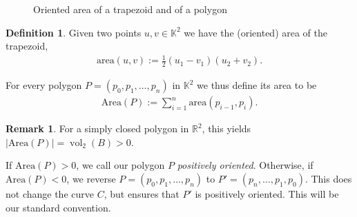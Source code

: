 \documentclass[a4paper]{amsart}
\numberwithin{equation}{section}
\theoremstyle{plain}
\theoremstyle{definition}
\newtheorem{definition}[theorem]{Definition}
\newtheorem{remark}[theorem]{Remark}
\newcommand{\R}{\mathbb{R}}
\newcommand{\K}{\mathbb{K}}
\newcommand{\abs}[1]{\lvert #1 \rvert}
\DeclareMathOperator{\vol}{vol}
\newcommand{\area}{\mathrm{area}}
\newcommand{\Area}{\mathrm{Area}}
\begin{document}
\begin{figure}[ht]
  \caption{Oriented area of a trapezoid and of a polygon}
  \label{fig:AreaAngle}
\end{figure}

\begin{definition}
  Given two points $u,v \in \K^2$ we have the (oriented) area of the trapezoid,
  \begin{align}
    \area(u,v) := \frac{1}{2} (u_1 - v_1) (u_2 + v_2) .
  \end{align}
  
  For every polygon $P = (p_0,p_1,\ldots,p_n)$ in $\K^2$
  we thus define its area to be 
  \begin{align}
    \label{eq:Area}
    \Area(P) := \sum_{i=1}^{n} \area(p_{i-1},p_i) .
  \end{align}
\end{definition}

\begin{remark}
  For a simply closed polygon in $\R^2$, this yields $\abs{\Area(P)} = \vol_2(B) > 0$.
  
  If $\Area(P) > 0$, we call our polygon $P$ \emph{positively oriented}.
  Otherwise, if $\Area(P) < 0$, we reverse $P = (p_0,p_1,\ldots,p_n)$
  to $P' = (p_n,\ldots,p_1,p_0)$.  This does not change the curve $C$,
  but ensures that $P'$ is positively oriented.
  This will be our standard convention.
\end{remark}
\end{document}
